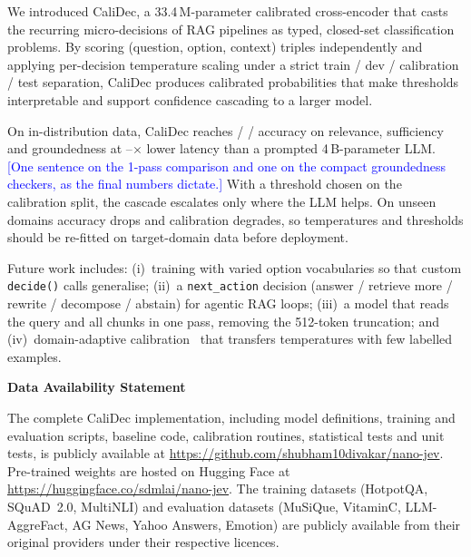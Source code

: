 \documentclass[twocolumn]{ICCKjournal}
\newcommand{\revnote}[1]{\textcolor{blue}{[#1]}}
\begin{document}
We introduced CaliDec, a 33.4\,M-parameter calibrated cross-encoder that casts the recurring micro-decisions of RAG pipelines as typed, closed-set classification problems. By scoring (question, option, context) triples independently and applying per-decision temperature scaling under a strict train / dev / calibration / test separation, CaliDec produces calibrated probabilities that make thresholds interpretable and support confidence cascading to a larger model.

On in-distribution data, CaliDec reaches \NJRelTest{} / \NJSufTest{} / \NJGroTest{} accuracy on relevance, sufficiency and groundedness at \SpeedupMin--\SpeedupMax$\times$ lower latency than a prompted 4\,B-parameter LLM. \revnote{One sentence on the 1-pass comparison and one on the compact groundedness checkers, as the final numbers dictate.} With a threshold chosen on the calibration split, the cascade escalates only where the LLM helps. On unseen domains accuracy drops and calibration degrades, so temperatures and thresholds should be re-fitted on target-domain data before deployment.

Future work includes: (i)~training with varied option vocabularies so that custom \texttt{decide()} calls generalise; (ii)~a \texttt{next\_action} decision (answer / retrieve more / rewrite / decompose / abstain) for agentic RAG loops; (iii)~a model that reads the query and all chunks in one pass, removing the 512-token truncation; and (iv)~domain-adaptive calibration~\cite{zhao2021calibrate} that transfers temperatures with few labelled examples.


\par
\vspace{10pt}
{\large\textbf{Data Availability Statement}}

The complete CaliDec implementation, including model definitions, training and evaluation scripts, baseline code, calibration routines, statistical tests and unit tests, is publicly available at \url{https://github.com/shubham10divakar/nano-jev}. Pre-trained weights are hosted on Hugging Face at \url{https://huggingface.co/sdmlai/nano-jev}. The training datasets (HotpotQA, SQuAD~2.0, MultiNLI) and evaluation datasets (MuSiQue, VitaminC, LLM-AggreFact, AG News, Yahoo Answers, Emotion) are publicly available from their original providers under their respective licences.
\end{document}
